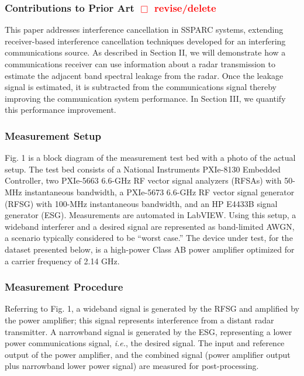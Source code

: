 \documentclass[11pt,onecolumn]{IEEEtran}
\begin{document}
\subsubsection{Contributions to Prior Art \textcolor{red}{$\Box$ revise/delete}}
This paper addresses interference cancellation in \mbox{SSPARC} systems, extending receiver-based interference cancellation techniques developed for an interfering communications source.  As described in Section II, we will demonstrate how a communications receiver can use information about a radar transmission to estimate the adjacent band spectral leakage from the radar.  Once the leakage signal is estimated, it is subtracted from the communications signal thereby improving the communication system performance.  In Section III, we quantify this performance improvement.

\subsubsection{Measurement Setup}
Fig. 1 is a block diagram of the measurement test bed with a photo of the actual setup.  The test bed consists of a National Instruments PXIe-8130 Embedded Controller, two PXIe-5663 6.6-GHz RF vector signal analyzers (RFSAs) with 50-MHz instantaneous bandwidth, a PXIe-5673 6.6-GHz RF vector signal generator (RFSG) with 100-MHz instantaneous bandwidth, and an HP E4433B signal generator  (ESG).  Measurements are automated in LabVIEW.  Using this setup, a wideband interferer and a desired signal are represented as band-limited AWGN, a scenario typically considered to be “worst case.”  The device under test, for the dataset presented below, is a high-power Class AB power amplifier optimized for a carrier frequency of 2.14 GHz.

\subsubsection{Measurement Procedure }
Referring to Fig. 1, a wideband signal is generated by the RFSG and amplified by the power amplifier; this signal represents interference from a distant radar transmitter.  A narrowband signal is generated by the ESG, representing a lower power communications signal, \emph{i.e.}, the desired signal.  The input and reference output of the power amplifier, and the combined signal (power amplifier output plus narrowband lower power signal) are measured for post-processing.
\end{document}
